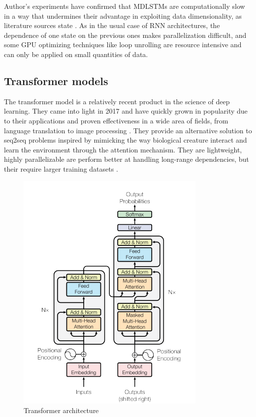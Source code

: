 Author's experiments have confirmed that MDLSTMs are computationally slow in a way that undermines their advantage in exploiting data dimensionality, as literature sources state \cite{MDLSTM_analysis} \cite{Juan}. As in the usual case of RNN architectures, the dependence of one state on the previous ones makes parallelization difficult, and some GPU optimizing techniques like loop unrolling are resource intensive and can only be applied on small quantities of data.

\subsection{Transformer models}
\label{subsec:ch4sec1subsec4}

The transformer model is a relatively recent product in the science of deep learning. They came into light in 2017 and have quickly grown in popularity due to their applications and proven effectiveness in a wide area of fields, from language translation to image processing \cite{Juan}. They provide an alternative solution to seq2seq problems inspired by mimicking the way biological creature interact and learn the environment through the attention mechanism. They are lightweight, highly parallelizable are perform better at handling long-range dependencies, but their require larger training datasets \cite{transformerNlp}.

\begin{figure}[htbp]
	\centering
		\includegraphics[scale=0.7]{figures/transformer}
	\caption{Transformer architecture \cite{transformer}}
	\label{FigTransformer}        
\end{figure}

